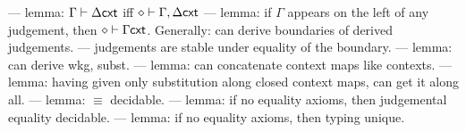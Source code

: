 --- lemma: $\Gamma \vdash \Delta \mathsf{cxt}$ iff $\diamond \vdash \Gamma , \Delta \mathsf{cxt}$
--- lemma: if $\Gamma$ appears on the left of any judgement, then $\diamond \vdash \Gamma \mathsf{cxt}$.  Generally: can derive boundaries of derived judgements.
--- judgements are stable under equality of the boundary.
--- lemma: can derive wkg, subst.
--- lemma: can concatenate context maps like contexts.
--- lemma: having given only substitution along closed context maps, can get it along all.  
--- lemma: $\equiv$ decidable.
--- lemma: if no equality axioms, then judgemental equality decidable.
--- lemma: if no equality axioms, then typing unique.
\para 



